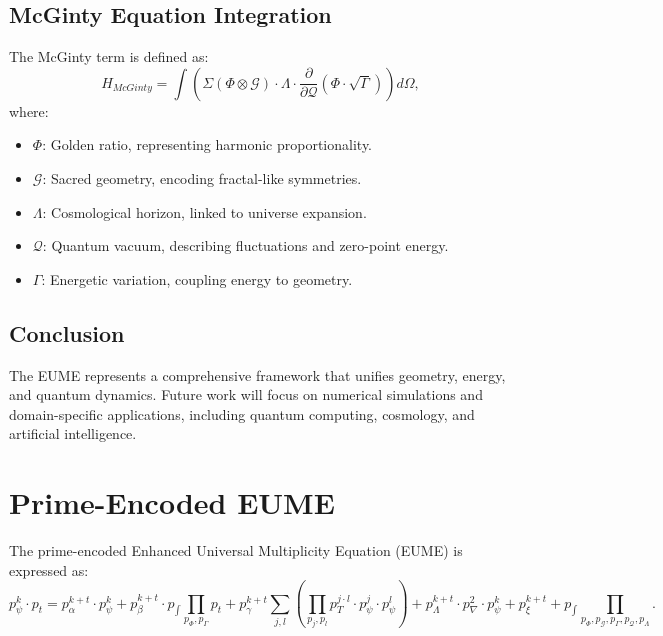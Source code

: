 \documentclass{article}
\theoremstyle{plain}
\begin{document}
\subsection{McGinty Equation Integration}
The McGinty term is defined as:
\[
H_{McGinty} = \int \left( \Sigma(\Phi \otimes \mathcal{G}) \cdot \Lambda \cdot \frac{\partial}{\partial \mathcal{Q}} \left(\Phi \cdot \sqrt{\Gamma}\right) \right) d\Omega,
\]
where:
\begin{itemize}
    \item \(\Phi\): Golden ratio, representing harmonic proportionality.
    \item \(\mathcal{G}\): Sacred geometry, encoding fractal-like symmetries.
    \item \(\Lambda\): Cosmological horizon, linked to universe expansion.
    \item \(\mathcal{Q}\): Quantum vacuum, describing fluctuations and zero-point energy.
    \item \(\Gamma\): Energetic variation, coupling energy to geometry.
\end{itemize}

\subsection{Conclusion}
The EUME represents a comprehensive framework that unifies geometry, energy, and quantum dynamics. Future work will focus on numerical simulations and domain-specific applications, including quantum computing, cosmology, and artificial intelligence.

\section{Prime-Encoded EUME}
The prime-encoded Enhanced Universal Multiplicity Equation (EUME) is expressed as:
\begin{equation}
p_\psi^k \cdot p_t = p_\alpha^{k+t} \cdot p_\psi^k 
+ p_\beta^{k+t} \cdot p_\int \prod_{p_\Phi, p_\Gamma} p_t 
+ p_\gamma^{k+t} \sum_{j,l} \left( \prod_{p_j, p_l} p_T^{j \cdot l} \cdot p_\psi^j \cdot p_\psi^l \right)
+ p_\Lambda^{k+t} \cdot p_\nabla^2 \cdot p_\psi^k 
+ p_\xi^{k+t} 
+ p_\int \prod_{p_\Phi, p_\mathcal{G}, p_\Gamma, p_\mathcal{Q}, p_\Lambda}.
\label{eq:prime-eume}
\end{equation}
\end{document}
